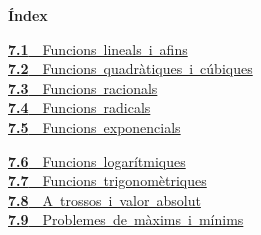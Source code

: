 \documentclass[11pt,a4paper]{article}
\begin{document}
\begin{tcolorbox}[colback=fmsurface,colframe=fmsurface,arc=3mm,left=4mm,right=4mm,top=2mm,bottom=2mm]
\small\textbf{Índex}\par\smallskip
\begin{minipage}[t]{0.49\linewidth}\small \mbox{\hyperlink{sec1}{\textbf{\color{fmgreen}7.1}\ \ Funcions lineals i afins}}\\[3pt]
\mbox{\hyperlink{sec2}{\textbf{\color{fmgreen}7.2}\ \ Funcions quadràtiques i cúbiques}}\\[3pt]
\mbox{\hyperlink{sec3}{\textbf{\color{fmgreen}7.3}\ \ Funcions racionals}}\\[3pt]
\mbox{\hyperlink{sec4}{\textbf{\color{fmgreen}7.4}\ \ Funcions radicals}}\\[3pt]
\mbox{\hyperlink{sec5}{\textbf{\color{fmgreen}7.5}\ \ Funcions exponencials}}\\[3pt]\end{minipage}\hfill\begin{minipage}[t]{0.49\linewidth}\small \mbox{\hyperlink{sec6}{\textbf{\color{fmgreen}7.6}\ \ Funcions logarítmiques}}\\[3pt]
\mbox{\hyperlink{sec7}{\textbf{\color{fmgreen}7.7}\ \ Funcions trigonomètriques}}\\[3pt]
\mbox{\hyperlink{sec8}{\textbf{\color{fmgreen}7.8}\ \ A trossos i valor absolut}}\\[3pt]
\mbox{\hyperlink{sec9}{\textbf{\color{fmgreen}7.9}\ \ Problemes de màxims i mínims}}\\[3pt]\end{minipage}
\end{tcolorbox}

\Needspace{5.7cm}
\end{document}
